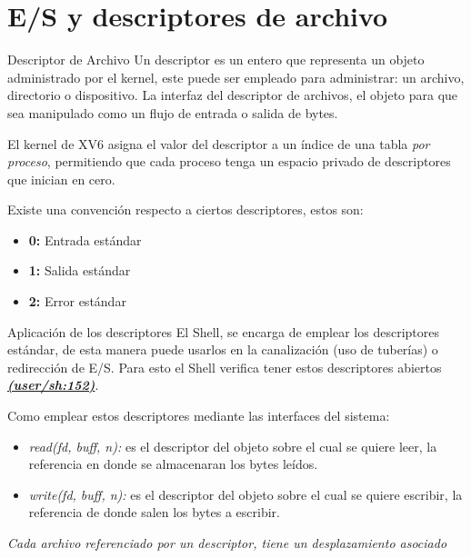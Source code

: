 \documentclass{libs/ufc_format}
\begin{document}
\section{E/S y descriptores de archivo}
\begin{frame}{Descriptor de Archivo}
  Un descriptor es un entero que representa un objeto administrado por el kernel, este puede ser empleado para administrar: un archivo, directorio o dispositivo. La interfaz del descriptor de archivos, el objeto para que sea manipulado como un flujo de entrada o salida de bytes.

  \vspace{0.4cm}

  El kernel de XV6 asigna el valor del descriptor a un índice de una tabla \textit{por proceso}, permitiendo que cada proceso tenga un espacio privado de descriptores que inician en cero.

  \vspace{0.4cm}

  Existe una convención respecto a ciertos descriptores, estos son:
  \begin{itemize}
    \item \textbf{0:} Entrada estándar
    \item \textbf{1:} Salida estándar
    \item \textbf{2:} Error estándar
  \end{itemize}
\end{frame}
\begin{frame}{Aplicación de los descriptores}
  El Shell, se encarga de emplear los descriptores estándar, de esta manera puede usarlos en la canalización (uso de tuberías) o redirección de E/S. Para esto el Shell verifica tener estos descriptores abiertos
  \href{https://github.com/CarlosSandoval-03/xv6-riscv/blob/riscv/user/sh.c\#L152}{\textbf{\textit{(user/sh:152)}}}. \cite{xv6}

  \vspace{0.2cm}

  Como emplear estos descriptores mediante las interfaces del sistema:
  \begin{itemize}
    \item \textit{read(fd, buff, n):} \textit{} es el descriptor del objeto sobre el cual se quiere leer, \textit{} la referencia en donde se almacenaran los \textit{} bytes leídos.
    \item \textit{write(fd, buff, n):} \textit{} es el descriptor del objeto sobre el cual se quiere escribir, \textit{} la referencia de donde salen los \textit{} bytes a escribir.
  \end{itemize}
  \emph{Cada archivo referenciado por un descriptor, tiene un desplazamiento asociado}
\end{frame}
\end{document}
